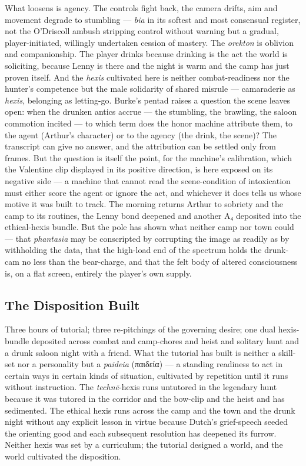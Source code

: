\documentclass{article}
\newcommand{\gk}[1]{{\greekfont #1}}
\begin{document}
What loosens is agency. The controls fight back, the camera drifts, aim and movement degrade to stumbling — \textit{bia} in its softest and most consensual register, not the O'Driscoll ambush stripping control without warning but a gradual, player-initiated, willingly undertaken cession of mastery. The \textit{orekton} is oblivion and companionship. The player drinks because drinking is the act the world is soliciting, because Lenny is there and the night is warm and the camp has just proven itself. And the \textit{hexis} cultivated here is neither combat-readiness nor the hunter's competence but the male solidarity of shared misrule — camaraderie as \textit{hexis}, belonging as letting-go. Burke's pentad raises a question the scene leaves open: when the drunken antics accrue — the stumbling, the brawling, the saloon commotion incited — to which term does the honor machine attribute them, to the agent (Arthur's character) or to the agency (the drink, the scene)? The transcript can give no answer, and the attribution can be settled only from frames. But the question is itself the point, for the machine's calibration, which the Valentine clip displayed in its positive direction, is here exposed on its negative side — a machine that cannot read the scene-condition of intoxication must either score the agent or ignore the act, and whichever it does tells us whose motive it was built to track. The morning returns Arthur to sobriety and the camp to its routines, the Lenny bond deepened and another A₄ deposited into the ethical-hexis bundle. But the pole has shown what neither camp nor town could — that \textit{phantasia} may be conscripted by corrupting the image as readily as by withholding the data, that the high-load end of the spectrum holds the drunk-cam no less than the bear-charge, and that the felt body of altered consciousness is, on a flat screen, entirely the player's own supply.

\bigskip

\subsection*{The Disposition Built}

Three hours of tutorial; three re-pitchings of the governing desire; one dual hexis-bundle deposited across combat and camp-chores and heist and solitary hunt and a drunk saloon night with a friend. What the tutorial has built is neither a skill-set nor a personality but a \textit{paideia} (\gk{παιδεία}) — a standing readiness to act in certain ways in certain kinds of situation, cultivated by repetition until it runs without instruction. The \textit{technē}-hexis runs untutored in the legendary hunt because it was tutored in the corridor and the bow-clip and the heist and has sedimented. The ethical hexis runs across the camp and the town and the drunk night without any explicit lesson in virtue because Dutch's grief-speech seeded the orienting good and each subsequent resolution has deepened its furrow. Neither hexis was set by a curriculum; the tutorial designed a world, and the world cultivated the disposition.
\end{document}
